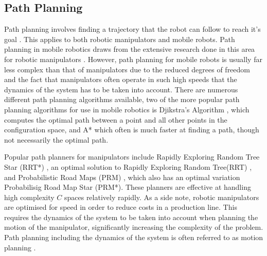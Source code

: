 \subsection{Path Planning} \label{sec:T:RC:PathPlanning}
Path planning involves finding a trajectory that the robot can follow to reach it's goal \cite{SiegwartRoland2011Itam}. This applies to both robotic manipulators and mobile robots. Path planning in mobile robotics draws from the extensive research done in this area for robotic manipulators \cite{SiegwartRoland2011Itam}. However, path planning for mobile robots is usually far less complex than that of manipulators due to the reduced degrees of freedom and the fact that manipulators often operate in such high speeds that the dynamics of the system has to be taken into account\cite{SiegwartRoland2011Itam}. There are numerous different path planning algorithms available, two of the more popular path planning algorithms for use in mobile robotics is Djikstra's Algorithm \cite{DijkstraE.W1959Anot}, which computes the optimal path between a point and all other points in the configuration space, and A* \cite{HartNilsson1968} which often is much faster at finding a path, though not necessarily the optimal path.

Popular path planners for manipulators include Rapidly Exploring Random Tree Star (RRT*) \cite{KaramanSertac2011Safo}, an optimal solution to Rapidly Exploring Random Tree(RRT) \cite{LaValleStevenM.2001RKP}, and Probabilistic Road Maps (PRM) \cite{KavrakiL.E.1996Prfp}, which also has an optimal variation Probabilisig Road Map Star (PRM*)\cite{KavrakiL.E.1996Prfp}. These planners are effective at handling high complexity $C$ spaces relatively rapidly\cite{LynchKevin2017Mr:m}. As a side note, robotic manipulators are optimised for speed in order to reduce costs in a production line. This requires the dynamics of the system to be taken into account when planning the motion of the manipulator, significantly increasing the complexity of the problem. Path planning including the dynamics of the system is often referred to as motion planning \cite{LynchKevin2017Mr:m}.

